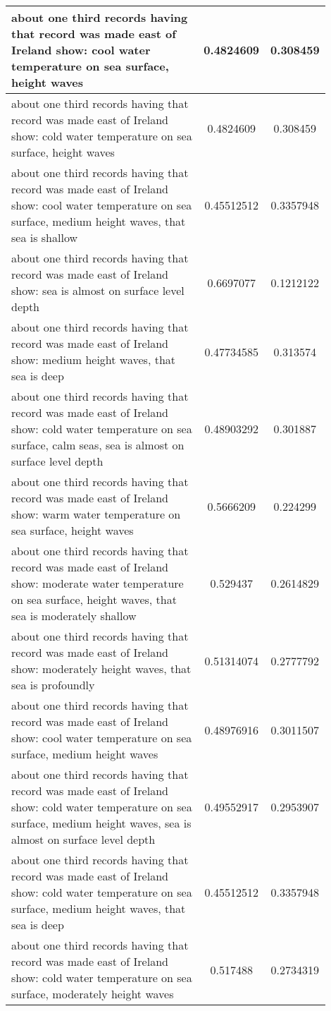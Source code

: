 \documentclass{article}
\begin{document}
\begin{longtable}{|p{0.9\linewidth}|c|c|}
about one third records having that record was made east of Ireland show: cool water temperature on sea surface, height waves & 0.4824609 & 0.308459 \\ \hline
about one third records having that record was made east of Ireland show: cold water temperature on sea surface, height waves & 0.4824609 & 0.308459 \\ \hline
about one third records having that record was made east of Ireland show: cool water temperature on sea surface, medium height waves, that sea is shallow & 0.45512512 & 0.3357948 \\ \hline
about one third records having that record was made east of Ireland show: sea is almost on surface level depth & 0.6697077 & 0.1212122 \\ \hline
about one third records having that record was made east of Ireland show: medium height waves, that sea is deep & 0.47734585 & 0.313574 \\ \hline
about one third records having that record was made east of Ireland show: cold water temperature on sea surface, calm seas, sea is almost on surface level depth & 0.48903292 & 0.301887 \\ \hline
about one third records having that record was made east of Ireland show: warm water temperature on sea surface, height waves & 0.5666209 & 0.224299 \\ \hline
about one third records having that record was made east of Ireland show: moderate water temperature on sea surface, height waves, that sea is moderately shallow & 0.529437 & 0.2614829 \\ \hline
about one third records having that record was made east of Ireland show: moderately height waves, that sea is profoundly & 0.51314074 & 0.2777792 \\ \hline
about one third records having that record was made east of Ireland show: cool water temperature on sea surface, medium height waves & 0.48976916 & 0.3011507 \\ \hline
about one third records having that record was made east of Ireland show: cold water temperature on sea surface, medium height waves, sea is almost on surface level depth & 0.49552917 & 0.2953907 \\ \hline
about one third records having that record was made east of Ireland show: cold water temperature on sea surface, medium height waves, that sea is deep & 0.45512512 & 0.3357948 \\ \hline
about one third records having that record was made east of Ireland show: cold water temperature on sea surface, moderately height waves & 0.517488 & 0.2734319 \\ \hline

\end{longtable}
\end{document}
